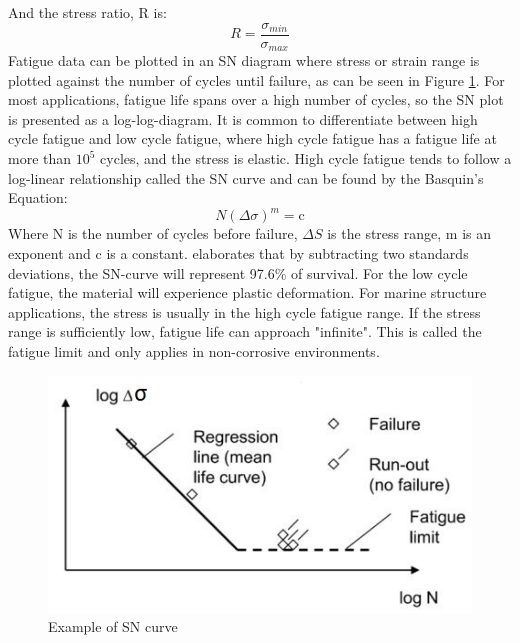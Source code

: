 \noindent And the stress ratio, R is:
\begin{equation}
    R=\frac{\sigma_{min}}{\sigma_{max}}
\end{equation}
Fatigue data can be plotted in an SN diagram where stress or strain range is plotted against the number of cycles until failure, as can be seen in Figure \ref{fig:sn}. For most applications, fatigue life spans over a high number of cycles, so the SN plot is presented as a log-log-diagram. It is common to differentiate between high cycle fatigue and low cycle fatigue, where high cycle fatigue has a fatigue life at more than $10^5$ cycles, and the stress is elastic. High cycle fatigue tends to follow a log-linear relationship called the SN curve and can be found by the Basquin’s Equation:
\begin{equation}
    N(\Delta \sigma)^m = \text{c}
\end{equation}
\label{eq:sn}
\noindernt Where N is the number of cycles before failure, $\Delta S$ is the stress range, m is an exponent and c is a constant. \cite{dnvfatigue} elaborates that by subtracting two standards deviations, the SN-curve will represent 97.6\% of survival. \newline
\newline
For the low cycle fatigue, the material will experience plastic deformation. For marine structure applications, the stress is usually in the high cycle fatigue range. If the stress range is sufficiently low, fatigue life can approach "infinite". This is called the fatigue limit and only applies in non-corrosive environments. 

\begin{figure}[h!]
\centering
\includegraphics[scale=1]{figures/sn}
\caption[$\; \:$Example of SN curve]{Example of SN curve  \cite{fatigue2016} }
 \label{fig:sn}
\end{figure}

